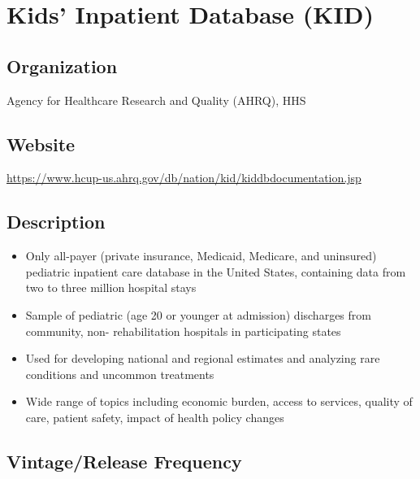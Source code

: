 \documentclass[
]{book}
\providecommand{\tightlist}{%
  \setlength{\itemsep}{0pt}\setlength{\parskip}{0pt}}
\begin{document}
\mainmatter

\hypertarget{kids-inpatient-database-kid}{%
\chapter{Kids' Inpatient Database (KID)}\label{kids-inpatient-database-kid}}

\hypertarget{organization-35}{%
\section{Organization}\label{organization-35}}

Agency for Healthcare Research and Quality (AHRQ), HHS

\hypertarget{website-35}{%
\section{Website}\label{website-35}}

\url{https://www.hcup-us.ahrq.gov/db/nation/kid/kiddbdocumentation.jsp}

\hypertarget{description-35}{%
\section{Description}\label{description-35}}

\begin{itemize}
\tightlist
\item
  Only all-payer (private insurance, Medicaid, Medicare, and uninsured) pediatric inpatient care database in the United States, containing data from two to three million hospital stays
\item
  Sample of pediatric (age 20 or younger at admission) discharges from community, non- rehabilitation hospitals in participating states
\item
  Used for developing national and regional estimates and analyzing rare conditions and uncommon treatments
\item
  Wide range of topics including economic burden, access to services, quality of care, patient safety, impact of health policy changes
\end{itemize}

\hypertarget{vintagerelease-frequency-35}{%
\section{Vintage/Release Frequency}\label{vintagerelease-frequency-35}}
\end{document}
